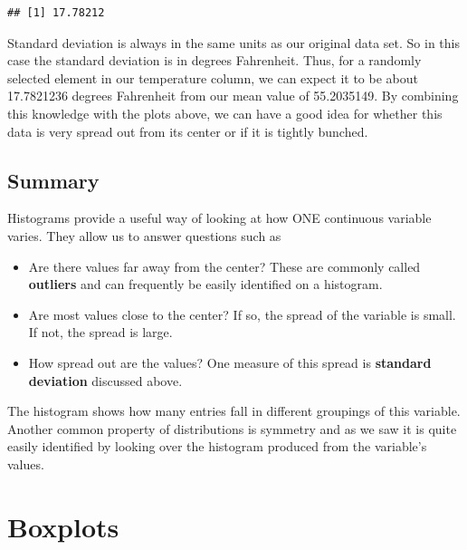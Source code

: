 \documentclass[]{tufte-book}
\newenvironment{Shaded}{\begin{snugshade}}{\end{snugshade}}
\newcommand{\KeywordTok}[1]{\textcolor[rgb]{0.13,0.29,0.53}{\textbf{{#1}}}}
\newcommand{\DataTypeTok}[1]{\textcolor[rgb]{0.13,0.29,0.53}{{#1}}}
\newcommand{\OtherTok}[1]{\textcolor[rgb]{0.56,0.35,0.01}{{#1}}}
\newcommand{\NormalTok}[1]{{#1}}
\providecommand{\tightlist}{%
  \setlength{\itemsep}{0pt}\setlength{\parskip}{0pt}}
\begin{document}
\begin{Shaded}
\end{Shaded}

\begin{verbatim}
## [1] 17.78212
\end{verbatim}

Standard deviation is always in the same units as our original data set.
So in this case the standard deviation is in degrees Fahrenheit. Thus,
for a randomly selected element in our temperature column, we can expect
it to be about 17.7821236 degrees Fahrenheit from our mean value of
55.2035149. By combining this knowledge with the plots above, we can
have a good idea for whether this data is very spread out from its
center or if it is tightly bunched.

\subsection{Summary}\label{summary}

Histograms provide a useful way of looking at how ONE continuous
variable varies. They allow us to answer questions such as

\begin{itemize}
\tightlist
\item
  Are there values far away from the center? These are commonly called
  \textbf{outliers} and can frequently be easily identified on a
  histogram.
\item
  Are most values close to the center? If so, the spread of the variable
  is small. If not, the spread is large.
\item
  How spread out are the values? One measure of this spread is
  \textbf{standard deviation} discussed above.
\end{itemize}

The histogram shows how many entries fall in different groupings of this
variable. Another common property of distributions is symmetry and as we
saw it is quite easily identified by looking over the histogram produced
from the variable's values.

\section{Boxplots}\label{boxplots}
\end{document}
